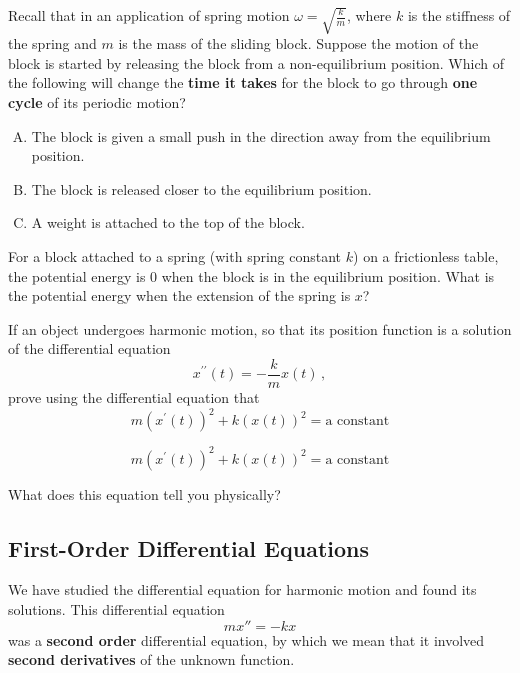 \documentclass[12pt]{amsart}
\begin{document}
\newpage
\begin{problem}
  Recall that in an application of spring motion
  $\displaystyle\omega = \sqrt{\frac{k}{m}}$, where $k$ is the
  stiffness of the spring and $m$ is the mass of the sliding block.
  Suppose the motion of the block is started by releasing the block
  from a non-equilibrium position.  Which of the following will change
  the {\bf time it takes} for the block to go through {\bf one cycle} of its
  periodic motion? \\[1ex]
\begin{enumerate}[A.]
\item The block is given a small push in the direction away from the equilibrium position. \\[1ex]
\item The block is released closer to the equilibrium position. \\[1ex]
\item A weight is attached to the top of the block.
\end{enumerate}

\end{problem}


\newpage
\begin{problem}
For a block attached to a spring (with spring constant $k$) on a
frictionless table, the potential energy is 0 when the block is in
the equilibrium position. What is the potential energy when the
extension of the spring is $x$?

\end{problem}

\newpage
 \begin{problem}
If an object undergoes harmonic motion, so that its
position function is a solution of the differential equation
$$ x^{\prime\prime} (t) = - \frac{k}{m} x(t)\, ,$$ prove using the
differential equation that
$$ m(x^\prime(t))^2 + k(x(t))^2 = \mbox{a constant}$$
\end{problem}

\newpage
$$ m(x^\prime(t))^2 + k(x(t))^2 = \mbox{a constant}$$
\begin{problem}
What does this equation tell you physically?
\end{problem}




\newpage

\subsection*{First-Order Differential Equations}
We have studied the differential equation for harmonic motion and
found its solutions.  This differential equation 
$$ m x'' = - k x$$
was a {\bf second order} differential equation, by which we mean that
it involved {\bf second derivatives} of the unknown function. 
\end{document}
